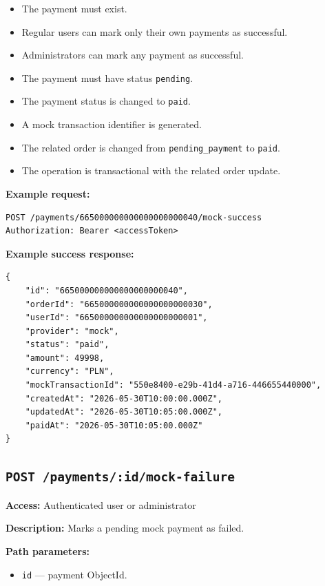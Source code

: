 \begin{itemize}
    \item The payment must exist.
    \item Regular users can mark only their own payments as successful.
    \item Administrators can mark any payment as successful.
    \item The payment must have status \texttt{pending}.
    \item The payment status is changed to \texttt{paid}.
    \item A mock transaction identifier is generated.
    \item The related order is changed from \texttt{pending\_payment} to \texttt{paid}.
    \item The operation is transactional with the related order update.
\end{itemize}

\textbf{Example request:}

\begin{verbatim}
POST /payments/665000000000000000000040/mock-success
Authorization: Bearer <accessToken>
\end{verbatim}

\pagebreak
\textbf{Example success response:}

\begin{verbatim}
{
    "id": "665000000000000000000040",
    "orderId": "665000000000000000000030",
    "userId": "665000000000000000000001",
    "provider": "mock",
    "status": "paid",
    "amount": 49998,
    "currency": "PLN",
    "mockTransactionId": "550e8400-e29b-41d4-a716-446655440000",
    "createdAt": "2026-05-30T10:00:00.000Z",
    "updatedAt": "2026-05-30T10:05:00.000Z",
    "paidAt": "2026-05-30T10:05:00.000Z"
}
\end{verbatim}

\subsection{\texttt{POST /payments/:id/mock-failure}}

\textbf{Access:} Authenticated user or administrator

\textbf{Description:} Marks a pending mock payment as failed.

\textbf{Path parameters:}

\begin{itemize}
    \item \texttt{id} --- payment ObjectId.
\end{itemize}

